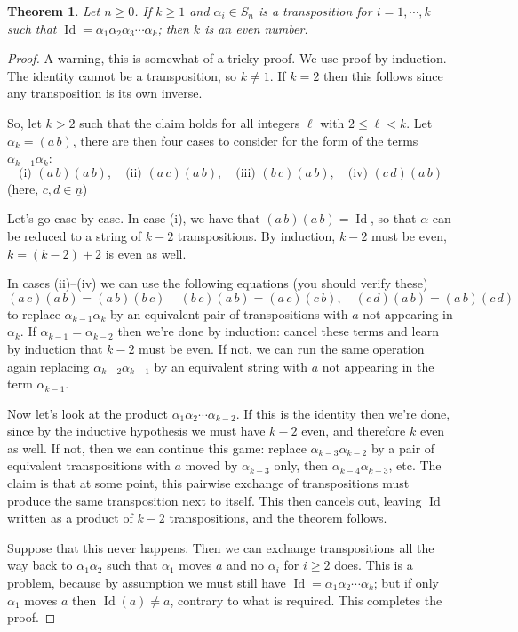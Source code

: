 \documentclass[12pt]{article}
\numberwithin{equation}{subsection}
\newtheorem{thm}[subsection]{Theorem}
\theoremstyle{note}
\newcommand{\Id}{\operatorname{Id}}
\begin{document}
\begin{thm} \label{id-is-even}
	Let $n\geq 0$. If $k\geq 1$ and $\alpha_i\in S_n$ is a transposition for $i=1,\cdots,k$ such that $\Id=\alpha_1\alpha_{2}\alpha_3 \cdots \alpha_k$; then $k$ is an even number.
\end{thm}
\begin{proof}
	A warning, this is somewhat of a tricky proof. We use proof by induction. The identity cannot be a transposition, so $k\neq 1$. If $k=2$ then this follows since any transposition is its own inverse. 
	
	So, let $k>2$ such that the claim holds for all integers $\ell$ with $2\leq \ell < k$. Let $\alpha_k=(a\,b)$, there are then four cases to consider for the form of the terms $\alpha_{k-1}\alpha_k$: \[ \text{(i) } (a \, b)(a\, b),  \quad\text{(ii) } (a \, c)(a\, b) , \quad\text{(iii) } (b \, c)(a\, b) , \quad\text{(iv) } (c \, d)(a\, b)\]
	(here, $c,d\in \underline{n}$)
	
	Let's go case by case. In case (i), we have that $(a\, b)(a\, b)=\Id$, so that $\alpha$ can be reduced to a string of $k-2$ transpositions. By induction, $k-2$ must be even, $k=(k-2)+2$ is even as well. 
	
	In cases (ii)--(iv) we can use the following equations (you should verify these)  \begin{equation} (a\,c)(a\,b)=(a\, b)(b\, c)\, \quad (b\,c)(a\, b)=(a\,c)(c\,b), \quad (c\,d)(a\,b)=(a\,b)(c\,d) \end{equation} to replace $\alpha_{k-1}\alpha_k$ by an equivalent pair of transpositions with $a$ not appearing in $\alpha_k$. If $\alpha_{k-1}=\alpha_{k-2}$ then we're done by induction: cancel these terms and learn by induction that $k-2$ must be even. If not, we can run the same operation again replacing $\alpha_{k-2}\alpha_{k-1}$ by an equivalent string with $a$ not appearing in the term $\alpha_{k-1}$. 
	
	Now let's look at the product $\alpha_1\alpha_2\cdots\alpha_{k-2}$. If this is the identity then we're done, since by the inductive hypothesis we must have $k-2$ even, and therefore $k$ even as well. If not, then we can continue this game: replace $\alpha_{k-3}\alpha_{k-2}$ by a pair of equivalent transpositions with $a$ moved by $\alpha_{k-3}$ only, then $\alpha_{k-4}\alpha_{k-3}$, etc. The claim is that at some point, this pairwise exchange of transpositions must produce the same transposition next to itself. This then cancels out, leaving $\Id$ written as a product of $k-2$ transpositions, and the theorem follows. 
	
	Suppose that this never happens. Then we can exchange transpositions all the way back to $\alpha_1\alpha_2$ such that $\alpha_1$ moves $a$ and no $\alpha_i$ for $i\geq 2$ does. This is a problem, because by assumption we must still have $\Id=\alpha_1\alpha_2\cdots\alpha_k$; but if only $\alpha_1$ moves $a$ then $\Id(a)\neq a$, contrary to what is required. This completes the proof.\end{proof} 
\end{document}

